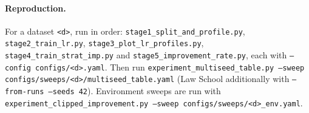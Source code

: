\paragraph{Reproduction.}
For a dataset \texttt{<d>}, run in order:
\texttt{stage1\_split\_and\_profile.py}, \texttt{stage2\_train\_lr.py},
\texttt{stage3\_plot\_lr\_profiles.py}, \texttt{stage4\_train\_strat\_imp.py} and
\texttt{stage5\_improvement\_rate.py}, each with \texttt{--config configs/<d>.yaml}.
Then run
\texttt{experiment\_multiseed\_table.py --sweep configs/sweeps/<d>/multiseed\_table.yaml}
(Law School additionally with \texttt{--from-runs --seeds 42}).
Environment sweeps are run with
\texttt{experiment\_clipped\_improvement.py --sweep configs/sweeps/<d>\_env.yaml}.
